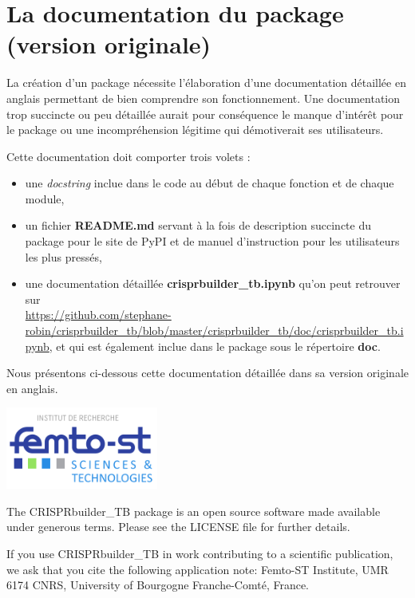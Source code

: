 \documentclass[twoside,a4paper,11pt,frenchb,openany]{report}
\begin{document}
\chapter{La documentation du package \\(version originale)}


La création d'un package nécessite l'élaboration d'une documentation détaillée en anglais permettant de bien comprendre son fonctionnement. Une documentation trop succincte ou peu détaillée aurait pour conséquence le manque d'intérêt pour le package ou une incompréhension légitime qui démotiverait ses utilisateurs.

Cette documentation doit comporter trois volets :
\begin{itemize}
\item une \textit{docstring} inclue dans le code au début de chaque fonction et de chaque module,
\item un fichier \textbf{README.md} servant à la fois de description succincte du package pour le site de PyPI et de manuel d'instruction pour les utilisateurs les plus pressés,
\item une documentation détaillée \textbf{crisprbuilder\_tb.ipynb} qu'on peut retrouver sur \\ \url{https://github.com/stephane-robin/crisprbuilder_tb/blob/master/crisprbuilder_tb/doc/crisprbuilder_tb.ipynb}, et qui est également inclue dans le package sous le répertoire \textbf{doc}.
\end{itemize}   

Nous présentons ci-dessous cette documentation détaillée dans sa version originale en anglais.

\includegraphics[width=5cm]{femto.png}

The CRISPRbuilder\_TB package is an open source software made available
under generous terms. Please see the LICENSE file for further details.

If you use CRISPRbuilder\_TB in work contributing to a scientific
publication, we ask that you cite the following application note:
Femto-ST Institute, UMR 6174 CNRS, University of Bourgogne
Franche-Comté, France.
\end{document}
